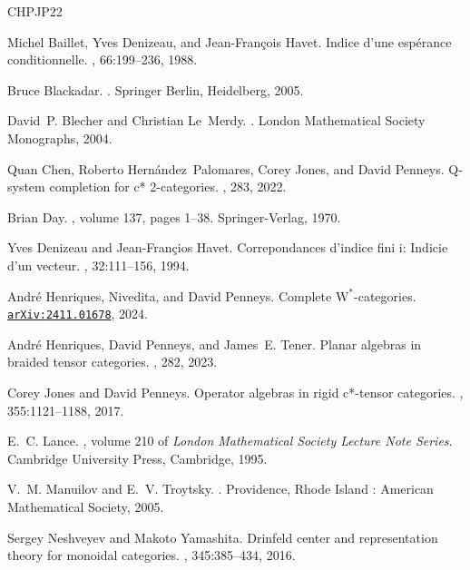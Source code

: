 \documentclass[11pt,reqno]{amsart}
\newcommand{\arxiv}[1]{\href{http://arxiv.org/abs/#1}{\tt arXiv:\nolinkurl{#1}}}
\numberwithin{equation}{section}
\theoremstyle{plain}
\begin{document}
\begin{thebibliography}{CHPJP22}

Michel Baillet, Yves Denizeau, and Jean-Fran\c{c}ois Havet.
\newblock Indice d'une espérance conditionnelle.
, 66:199--236, 1988.

Bruce Blackadar.
.
\newblock Springer Berlin, Heidelberg, 2005.

David~P. Blecher and Christian Le~Merdy.
.
\newblock London Mathematical Society Monographs, 2004.

Quan Chen, Roberto Hern\'andez~Palomares, Corey Jones, and David Penneys.
\newblock Q-system completion for c* 2-categories.
, 283, 2022.

Brian Day.
, volume 137, pages 1--38.
\newblock Springer-Verlag, 1970.

Yves Denizeau and Jean-Fran\c{c}ios Havet.
\newblock Correpondances d'indice fini i: Indicie d'un vecteur.
, 32:111--156, 1994.

Andr\'e Henriques, Nivedita, and David Penneys.
\newblock Complete $\mathrm{W}^*$-categories.
\newblock \arxiv{2411.01678}, 2024.

André Henriques, David Penneys, and James~E. Tener.
\newblock Planar algebras in braided tensor categories.
, 282, 2023.

Corey Jones and David Penneys.
\newblock Operator algebras in rigid c*-tensor categories.
, 355:1121--1188, 2017.

E.~C. Lance.
, volume 210 of {\em London Mathematical Society Lecture Note Series}.
\newblock Cambridge University Press, Cambridge, 1995.

V.~M. Manuilov and E.~V. Troytsky.
.
\newblock Providence, Rhode Island : American Mathematical Society, 2005.

Sergey Neshveyev and Makoto Yamashita.
\newblock Drinfeld center and representation theory for monoidal categories.
, 345:385--434, 2016.


\end{thebibliography}
\end{document}

